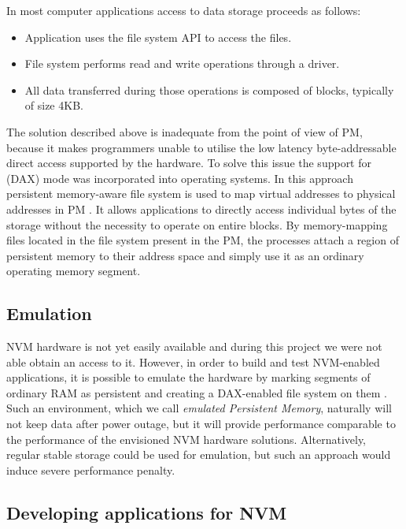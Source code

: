         In most computer applications access to data storage proceeds as follows:
        \begin{itemize}
            \item Application uses the file system API to access the files.
            \item File system performs read and write operations through a driver.
            \item All data transferred during those operations is composed of blocks, typically of size 4KB.
        \end{itemize}
        The solution described above is inadequate from the point of view of PM, because it makes programmers unable to utilise the low latency byte-addressable direct access supported by the hardware.
        To solve this issue the support for \DAX (DAX) mode was incorporated into operating systems.
        In this approach persistent memory-aware file system is used to map virtual addresses to physical addresses in PM \cite{PmemAccess}. 
        It allows applications to directly access individual bytes of the storage without the necessity to operate on entire blocks. By memory-mapping files located in the file system present in the PM, the processes attach a region of persistent memory to their address space and simply use it as an ordinary operating memory  segment.
      
    \subsection{Emulation}
        NVM hardware is not yet easily available and during this project we were not able obtain an access to it. However, in order to build and test NVM-enabled applications, it is possible to emulate the hardware by marking segments of ordinary RAM as persistent and creating a DAX-enabled file system on them \cite{PmemEmulation}.
        Such an environment, which we call \emph{emulated Persistent Memory}, naturally will not keep data after power outage, but it will provide performance comparable to the performance of the envisioned NVM hardware solutions. Alternatively, regular stable storage could be used for emulation, but such an approach would induce severe performance penalty. 
        
    \subsection{Developing applications for NVM}
        
